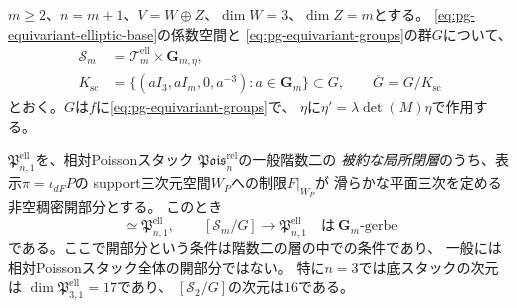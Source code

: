 \begin{proposition}[階数二のPoissonスタックと座標スカラーのgerbe]
\label{prop:pg-equivariant-poisson-gerbe}
$m\ge2$、$n=m+1$、$V=W\oplus Z$、$\dim W=3$、$\dim Z=m$とする。
\eqref{eq:pg-equivariant-elliptic-base}の係数空間と
\eqref{eq:pg-equivariant-groups}の群$G$について、
\begin{equation}
 \begin{aligned}
 \mathscr S_m&=\mathcal T_m^{\mathrm{ell}}\times\mathbf G_{m,\eta},\\
 K_{\mathrm{sc}}&=
 \{(aI_3,aI_m,0,a^{-3}):a\in\mathbf G_m\}\subset G,
 \qquad \overline G=G/K_{\mathrm{sc}}
 \end{aligned}
 \label{eq:pg-equivariant-gerbe-parameter}
\end{equation}
とおく。$G$は$f$に\eqref{eq:pg-equivariant-groups}で、
$\eta$に$\eta'=\lambda\det(M)\eta$で作用する。

$\mathfrak P_{n,1}^{\mathrm{ell}}$を、相対Poissonスタック
$\mathfrak{Pois}^{\mathrm{rel}}_n$の一般階数二の
\emph{被約な局所閉層}のうち、表示$\pi=\iota_{dF}P$の
support三次元空間$W_P$への制限$F|_{W_P}$が
滑らかな平面三次を定める非空稠密開部分とする。
このとき
\begin{equation}
 [\mathscr S_m/\overline G]\simeq
 \mathfrak P_{n,1}^{\mathrm{ell}},\qquad
 [\mathscr S_m/G]\longrightarrow
 \mathfrak P_{n,1}^{\mathrm{ell}}
 \quad\text{は}\ \mathbf G_m\text{-gerbe}
 \label{eq:pg-equivariant-poisson-gerbe}
\end{equation}
である。ここで開部分という条件は階数二の層の中での条件であり、
一般には相対Poissonスタック全体の開部分ではない。
特に$n=3$では底スタックの次元は
$\dim\mathfrak P_{3,1}^{\mathrm{ell}}=17$であり、
$[\mathscr S_2/G]$の次元は$16$である。
\end{proposition}
